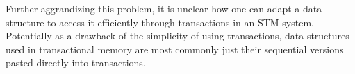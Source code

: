 \documentclass[runningheads,a4paper]{article}
\begin{document}

Further aggrandizing this problem, it is unclear how one can adapt a data structure to 
access it efficiently through transactions in an STM system.
Potentially as a drawback of the simplicity of using transactions, 
data structures used in transactional memory are most commonly just
their sequential versions pasted directly into transactions.
\end{document}
